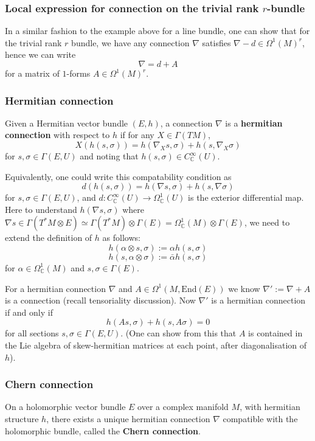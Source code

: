 \documentclass[a4paper]{article}
\theoremstyle{definition} \newtheorem*{definition}{Definition}
\theoremstyle{definition} \newtheorem*{definitions}{Definitions}
\theoremstyle{plain} \newtheorem{theorem}{Theorem}[section]
\theoremstyle{plain} \newtheorem{proposition}[theorem]{Proposition}
\theoremstyle{plain} \newtheorem{corollary}[theorem]{Corollary}
\theoremstyle{plain} \newtheorem{lemma}[theorem]{Lemma}
\theoremstyle{plain} \newtheorem{example}[theorem]{Example}
\newcommand{\defn}[1]{\textbf{#1}}
\newcommand{\complexnos}{\mathbb{C}}
\newcommand{\End}{\text{End}}
\newcommand{\smooth}{C^\infty}
\begin{document}
\subsubsection{Local expression for connection on the trivial rank $r$-bundle}
In a similar fashion to the example above for a line bundle, one can show that for the trivial rank $r$ bundle, we have any connection $\nabla$ satisfies $\nabla - d\in \Omega^1(M)^r$, hence we can write
$$\nabla = d + A$$
for a matrix of $1$-forms $A\in \Omega^1(M)^r$.

\subsubsection{Hermitian connection}
Given a Hermitian vector bundle $(E, h)$, a connection $\nabla$ is a \defn{hermitian connection} with respect to $h$ if for any $X\in \Gamma(TM)$,
$$X(h(s, \sigma))=h(\nabla_X s, \sigma)+h(s,\nabla_X \sigma)$$
for $s, \sigma\in \Gamma(E, U)$ and noting that $h(s, \sigma)\in \smooth_\complexnos (U)$.

Equivalently, one could write this compatability condition as 
$$d(h(s, \sigma))=h(\nabla s, \sigma)+h(s,\nabla\sigma)$$
for $s, \sigma\in \Gamma(E, U)$, and $d:\smooth_\complexnos (U)\to \Omega_\complexnos^1(U)$ is the exterior differential map. Here to understand $h(\nabla s, \sigma)$ where $\nabla s\in \Gamma(T^* M\otimes E)\simeq \Gamma(T^*M)\otimes \Gamma(E)=\Omega^1_\complexnos(M)\otimes \Gamma(E)$, we need to extend the definition of $h$ as follows:
$$h(\alpha \otimes s, \sigma):=\alpha h(s, \sigma)$$
$$h(s, \alpha \otimes \sigma) := \bar{\alpha}h(s, \sigma)$$
for $\alpha \in \Omega_\complexnos^1(M)$ and $s, \sigma\in \Gamma(E)$.

For a hermitian connection $\nabla$ and $A\in \Omega^1(M, \End(E))$ we know $\nabla ' := \nabla + A$ is a connection (recall tensoriality discussion). Now $\nabla'$ is a hermitian connection if and only if
$$h(As, \sigma)+h(s, A\sigma)= 0$$
for all sections $s, \sigma \in \Gamma(E, U)$. (One can show from this that $A$ is contained in the Lie algebra of skew-hermitian matrices at each point, after  diagonalisation of $h$).

\subsubsection{Chern connection}
On a holomorphic vector bundle $E$ over a complex manifold $M$, with hermitian structure $h$, there exists a unique hermitian connection $\nabla$ compatible with the holomorphic bundle, called the \defn{Chern connection}. 
\end{document}
